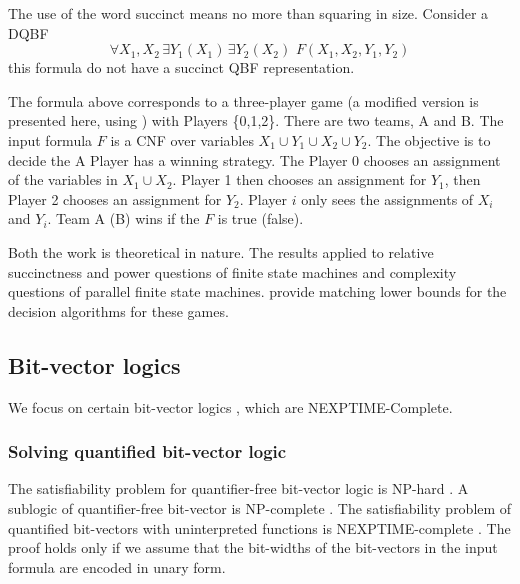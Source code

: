 \documentclass[runningheads]{llncs}
\begin{document}
The use of the word succinct means no more than squaring in size. Consider a DQBF
\[
\forall X_1,X_2 \, \exists Y_1(X_1) \, \exists Y_2(X_2) \,\, F (X_1, X_2, Y_1, Y_2)
\]
this formula do not have a succinct QBF representation.

The formula above corresponds to a three-player game (a modified version is presented here, using \cite{hearn06}) with Players \{0,1,2\}.
There are two teams, A and B.
The input formula $F$ is a CNF over variables $X_1 \cup Y_1 \cup X_2 \cup Y_2$.
The objective is to decide the A Player has a winning strategy.
The Player 0 chooses an assignment of the variables in $X_1 \cup X_2$.
Player 1 then chooses an assignment for $Y_1$, then Player 2 chooses an assignment for $Y_2$.
Player $i$ only sees the assignments of $X_i$ and $Y_i$. Team A (B) wins if the $F$ is true (false).

Both the work \cite{petersonr79, peterson2001lower} is theoretical in nature. The results applied to relative succinctness and power questions of finite state machines and complexity questions of parallel finite state machines.
\cite{peterson2001lower} provide matching lower bounds for the decision algorithms for these games.

\subsection{Bit-vector logics}\label{subsec:bitvectors}
We focus on certain bit-vector logics \cite{kovasznaifb12, wintersteigerhm10}, which are NEXPTIME-Complete.

\subsubsection{Solving quantified bit-vector logic \cite{wintersteigerhm10, wintersteigerhm13}}

The satisfiability problem for quantifier-free bit-vector logic is NP-hard \cite{barrettdl98}.
A sublogic of quantifier-free bit-vector is NP-complete \cite{bruttomessos09}.
The satisfiability problem of quantified bit-vectors with uninterpreted functions is NEXPTIME-complete \cite{wintersteiger2011termination, wintersteigerhm10, wintersteigerhm13}.
The proof holds only if we assume that the bit-widths of the bit-vectors in the input formula are encoded
in unary form.

\end{document}
